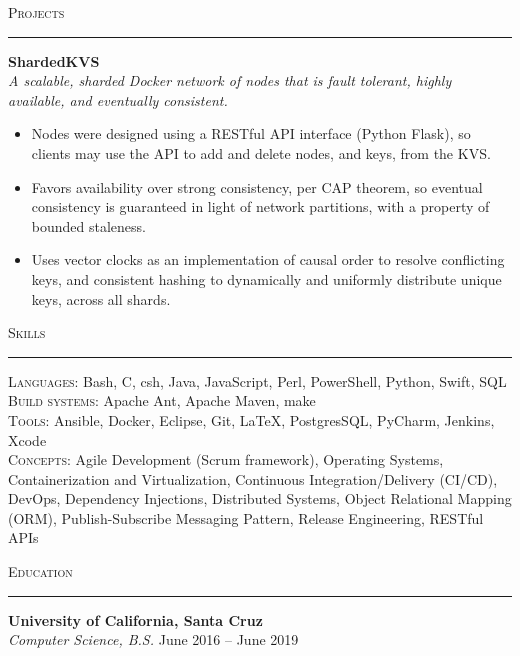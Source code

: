 \documentclass{res}
\begin{document}
\begin{resume}
\begin{itemize}
	\end{itemize}
\textsc{{\Large Projects}}
\vspace{0.5mm}
\hrule width18.5cm
\textbf{ShardedKVS}\\
\textit{A scalable, sharded Docker network of nodes that is fault tolerant, highly available, and eventually consistent.}
	\vspace{2mm}
	\begin{itemize}
    \item Nodes were designed using a RESTful API interface (Python Flask), so clients may use the API to add and delete nodes, and keys, from the KVS.
		\item Favors availability over strong consistency, per CAP theorem, so eventual consistency is guaranteed in light of network partitions, with a property of bounded staleness.
    \item Uses vector clocks as an implementation of causal order to resolve conflicting keys, and consistent hashing to dynamically and uniformly distribute unique keys, across all shards.
	\end{itemize}
\textsc{{\Large Skills}}
\vspace{0.5mm}
\hrule width18.5cm
\textsc{Languages:} Bash, C, csh, Java, JavaScript, Perl, PowerShell, Python, Swift, SQL\\[2mm]
\textsc{Build systems:} Apache Ant, Apache Maven, make\\[2mm]
\textsc{Tools:} Ansible, Docker, Eclipse, Git, \LaTeX, PostgresSQL, PyCharm, Jenkins, Xcode\\[2mm]
\textsc{Concepts:} Agile Development (Scrum framework), Operating Systems, Containerization and Virtualization, Continuous Integration/Delivery (CI/CD), DevOps, Dependency Injections, Distributed Systems, Object Relational Mapping (ORM), Publish-Subscribe Messaging Pattern, Release Engineering, RESTful APIs\\[0.5mm]
\vspace{-4mm}

\textsc{{\Large Education}}
\vspace{0.5mm}
\hrule width18.5cm
\textbf{University of California, Santa Cruz}\\
\textit{Computer Science, B.S.}
\hfill
June 2016 -- June 2019\\
\vspace{-2mm}
\end{resume}
\end{document}
